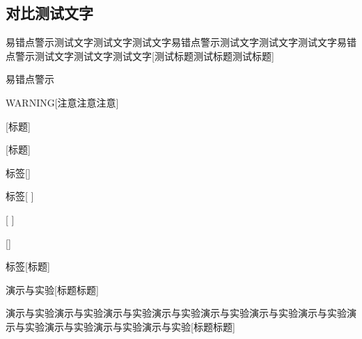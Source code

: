 \documentclass[color=green]{textbook-cn}%
\begin{document}
\begin{Project}
\subsection*{对比测试文字}

\begin{box1}{易错点警示测试文字测试文字测试文字易错点警示测试文字测试文字测试文字易错点警示测试文字测试文字测试文字}[测试标题测试标题测试标题]
\lipsum[2]
\end{box1}


\begin{box1}{易错点警示}
\lipsum[2]
\end{box1}

\begin{Warning}
	\lipsum[2]
\end{Warning}


\begin{box1}{WARNING}[注意注意注意]
	\lipsum[2]
\end{box1}


\begin{box1}{}[标题]
	\lipsum[2][1-3]
\end{box1}

\begin{box1}{ }[标题]
	\lipsum[2][1-3]
\end{box1}

\begin{box1}{标签}[]
	\lipsum[2][1-3]
\end{box1}

\begin{box1}{标签}[ ]
	\lipsum[2][1-3]
\end{box1}

\begin{box1}{ }[ ]
	\lipsum[2][1-3]
\end{box1}

\begin{box1}{}[]
	\lipsum[2][1-3]
\end{box1}

\begin{box1}{标签}[标题]
	\lipsum[2][1-3]
\end{box1}




\begin{box2}{演示与实验}[标题标题]
	\lipsum[2]
\end{box2}


\begin{box2}{演示与实验演示与实验演示与实验演示与实验演示与实验演示与实验演示与实验演示与实验演示与实验演示与实验演示与实验}[标题标题]
	\lipsum[2]
\end{box2}


\end{Project}
\end{document}
